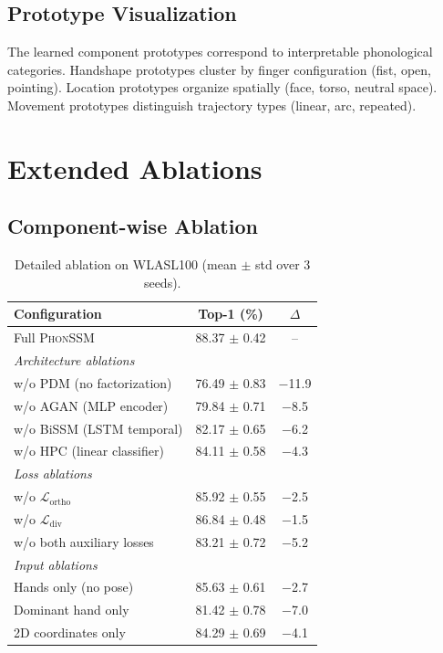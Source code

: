 \documentclass{article}
\theoremstyle{definition}
\theoremstyle{remark}
\newcommand{\phonssm}{\textsc{PhonSSM}}
\begin{document}
\subsection{Prototype Visualization}

The learned component prototypes correspond to interpretable phonological categories. Handshape prototypes cluster by finger configuration (fist, open, pointing). Location prototypes organize spatially (face, torso, neutral space). Movement prototypes distinguish trajectory types (linear, arc, repeated).

\section{Extended Ablations}
\label{app:ablations}

\subsection{Component-wise Ablation}

\begin{table}[ht]
\caption{Detailed ablation on WLASL100 (mean $\pm$ std over 3 seeds).}
\label{tab:ablation_detail}
\vspace{-1mm}
\begin{center}
\begin{small}
\begin{tabular*}{\columnwidth}{@{\extracolsep{\fill}}lcc@{}}
\toprule
Configuration & Top-1 (\%) & $\Delta$ \\
\midrule
Full \phonssm{} & 88.37 $\pm$ 0.42 & -- \\
\midrule
\multicolumn{3}{l}{\textit{Architecture ablations}} \\
w/o PDM (no factorization) & 76.49 $\pm$ 0.83 & $-$11.9 \\
w/o AGAN (MLP encoder) & 79.84 $\pm$ 0.71 & $-$8.5 \\
w/o BiSSM (LSTM temporal) & 82.17 $\pm$ 0.65 & $-$6.2 \\
w/o HPC (linear classifier) & 84.11 $\pm$ 0.58 & $-$4.3 \\
\midrule
\multicolumn{3}{l}{\textit{Loss ablations}} \\
w/o $\mathcal{L}_{\text{ortho}}$ & 85.92 $\pm$ 0.55 & $-$2.5 \\
w/o $\mathcal{L}_{\text{div}}$ & 86.84 $\pm$ 0.48 & $-$1.5 \\
w/o both auxiliary losses & 83.21 $\pm$ 0.72 & $-$5.2 \\
\midrule
\multicolumn{3}{l}{\textit{Input ablations}} \\
Hands only (no pose) & 85.63 $\pm$ 0.61 & $-$2.7 \\
Dominant hand only & 81.42 $\pm$ 0.78 & $-$7.0 \\
2D coordinates only & 84.29 $\pm$ 0.69 & $-$4.1 \\
\bottomrule
\end{tabular*}
\end{small}
\end{center}
\vspace{-2mm}
\end{table}
\end{document}
